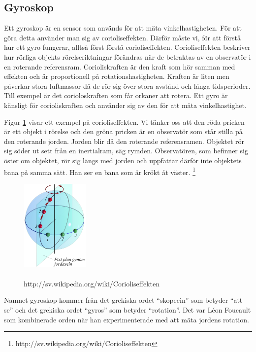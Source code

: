 \documentclass[a4paper,12pt,fleqn]{article}
\begin{document}
\subsection{Gyroskop}
Ett gyroskop är en sensor som används för att mäta vinkelhastigheten. För att göra detta använder man sig av corioliseffekten. Därför måste vi, för att förstå hur ett gyro fungerar, alltså först förstå corioliseffekten. Corioliseffekten beskriver hur rörliga objekts rörelseriktningar förändras när de betraktas av en observatör i en roterande referensram. Corioliskraften är den kraft som hör samman med effekten och är proportionell på rotationshastigheten. Kraften är liten men påverkar stora luftmassor då de rör sig över stora avstånd och långa tidsperioder. Till exempel är det corioloskraften som får orkaner att rotera. Ett gyro är känsligt för corioliskraften och använder sig av den för att mäta vinkelhastighet.

Figur \ref{fig:jord} visar ett exempel på corioliseffekten. Vi tänker oss att den röda pricken är ett objekt i rörelse och den gröna pricken är en observatör som står stilla på den roterande jorden. Jorden blir då den roterande referensramen. Objektet rör sig söder ut sett från en inertialram, säg rymden. Observatören, som befinner sig öster om objektet, rör sig längs med jorden och uppfattar därför inte objektets bana på samma sätt. Han ser en bana som är krökt åt väster.
\footnote{http://sv.wikipedia.org/wiki/Corioliseffekten}


\begin{figure}[h]
\begin{center}
\includegraphics[width=0.3\textwidth]
{Coriolisjord.png}
\caption{\\http://sv.wikipedia.org/wiki/Corioliseffekten}
\label{fig:jord}
\end{center}
\end{figure}

Namnet  gyroskop kommer från det grekiska ordet “skopeein” som betyder “att se” och det grekiska ordet “gyros” som betyder “rotation”. Det var Léon Foucault som kombinerade orden när han experimenterade med att mäta jordens rotation.
\end{document}
